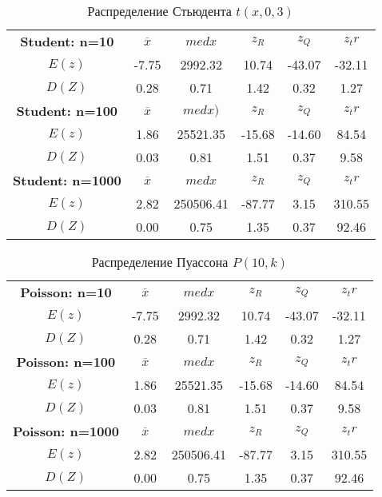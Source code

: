 \documentclass[14pt]{extarticle}
\begin{document}
\begin{table}[htbp]
    \centering
    \begin{tabular}{|c|c|c|c|c|c|}
        \toprule
        \textbf{Student: n=10} & \(\overline{x}\) & \(med x\) & \(z_R\) & \(z_Q\) & \(z_tr\)\\
        \(E(z)\) & -7.75 & 2992.32 & 10.74 & -43.07 & -32.11 \\
        \(D(Z)\) & 0.28 & 0.71 & 1.42 & 0.32 & 1.27 \\
        \midrule
  	\textbf{Student: n=100} & \(\overline{x}\) & \(med x)\) & \(z_R\) & \(z_Q\) & \(z_tr\)\\
        \(E(z)\) & 1.86 & 25521.35 & -15.68 & -14.60 & 84.54   \\
        \(D(Z)\) & 0.03 & 0.81 & 1.51 & 0.37 & 9.58 \\
        \midrule
	\textbf{Student: n=1000} & \(\overline{x}\) & \(med x\) & \(z_R\) & \(z_Q\) & \(z_tr\)\\
        \(E(z)\) & 2.82 & 250506.41 & -87.77 & 3.15 & 310.55 \\
        \(D(Z)\) & 0.00 & 0.75 & 1.35 & 0.37 & 92.46  \\
        \toprule
    \end{tabular}
    \caption{Распределение Стьюдента \(t(x, 0, 3)\)}
    \label{tab:student_t}
\end{table}

\begin{table}[htbp]
    \centering
    \begin{tabular}{|c|c|c|c|c|c|}
        \toprule
        \textbf{Poisson: n=10} & \(\overline{x}\) & \(med x\) & \(z_R\) & \(z_Q\) & \(z_tr\)\\
        \(E(z)\) & -7.75 & 2992.32 & 10.74 & -43.07 & -32.11 \\
        \(D(Z)\) & 0.28 & 0.71 & 1.42 & 0.32 & 1.27 \\
        \midrule
  	\textbf{Poisson: n=100} & \(\overline{x}\) & \(med x\) & \(z_R\) & \(z_Q\) & \(z_tr\)\\
        \(E(z)\) & 1.86 & 25521.35 & -15.68 & -14.60 & 84.54   \\
        \(D(Z)\) & 0.03 & 0.81 & 1.51 & 0.37 & 9.58 \\
        \midrule
	\textbf{Poisson: n=1000} & \(\overline{x}\) & \(med x\) & \(z_R\) & \(z_Q\) & \(z_tr\)\\
        \(E(z)\) & 2.82 & 250506.41 & -87.77 & 3.15 & 310.55 \\
        \(D(Z)\) & 0.00 & 0.75 & 1.35 & 0.37 & 92.46  \\
        \toprule
    \end{tabular}
    \caption{Распределение Пуассона \(P(10, k)\)}
    \label{tab:poisson_t}
\end{table}
\end{document}
